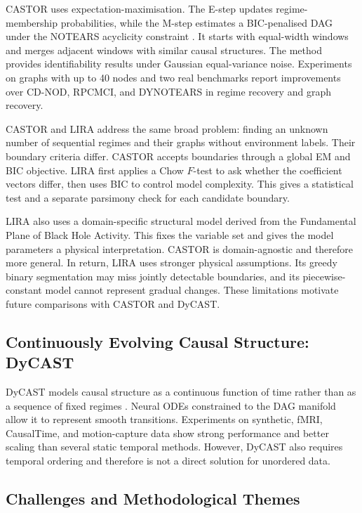CASTOR uses expectation-maximisation. The E-step updates regime-membership
probabilities, while the M-step estimates a BIC-penalised DAG under the NOTEARS
acyclicity constraint \cite{zheng2018dags}. It starts with equal-width windows and
merges adjacent windows with similar causal structures. The method provides
identifiability results under Gaussian equal-variance noise. Experiments on graphs
with up to 40 nodes and two real benchmarks report improvements over CD-NOD,
RPCMCI, and DYNOTEARS in regime recovery and graph recovery.

CASTOR and LIRA address the same broad problem: finding an unknown number of
sequential regimes and their graphs without environment labels. Their boundary
criteria differ. CASTOR accepts boundaries through a global EM and BIC objective.
LIRA first applies a Chow $F$-test to ask whether the coefficient vectors differ,
then uses BIC to control model complexity. This gives a statistical test and a
separate parsimony check for each candidate boundary.

LIRA also uses a domain-specific structural model derived from the Fundamental
Plane of Black Hole Activity. This fixes the variable set and gives the model
parameters a physical interpretation. CASTOR is domain-agnostic and therefore more
general. In return, LIRA uses stronger physical assumptions. Its greedy binary
segmentation may miss jointly detectable boundaries, and its piecewise-constant
model cannot represent gradual changes. These limitations motivate future
comparisons with CASTOR and DyCAST.

\subsection{Continuously Evolving Causal Structure: DyCAST}

DyCAST models causal structure as a continuous function of time rather than as a
sequence of fixed regimes \cite{cheng2025dycast}. Neural ODEs constrained to the
DAG manifold allow it to represent smooth transitions. Experiments on synthetic,
fMRI, CausalTime, and motion-capture data show strong performance and better
scaling than several static temporal methods. However, DyCAST also requires
temporal ordering and therefore is not a direct solution for unordered data.

\subsection{Challenges and Methodological Themes}

